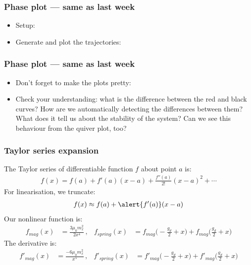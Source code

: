 \documentclass[9pt]{beamer-control}
\begin{document}
\begin{frame}
  \frametitle{Phase plot --- same as last week}

  \begin{itemize}
    \item Setup:
  \end{itemize}

  \begin{itemize}
    \item Generate and plot the trajectories:
  \end{itemize}

\end{frame}

\begin{frame}
  \frametitle{Phase plot --- same as last week}

  \begin{itemize}
    \item Don't forget to make the plots pretty:
  \end{itemize}


  \begin{itemize}
    \item Check your understanding: what is the difference between the red and black curves? How are we automatically detecting the differences between them? What does it tell us about the stability of the system? Can we see this behaviour from the quiver plot, too?
  \end{itemize}

\end{frame}



\begin{frame}
  \frametitle{Taylor series expansion}
  The Taylor series of differentiable function $f$ about point $a$ is:
  \begin{align}
    f(x) = f(a) + f'(a)(x - a) + \frac{f''(a)}{2!}(x - a)^2 + \cdots
  \end{align}
  For linearisation, we truncate:
  \begin{align}
    f(x) \approx f(a) + \alert{f'(a)}(x - a)
  \end{align}
  Our nonlinear function is:
  \begin{align}
    f_{mag}(x)  &= \frac{3 \mu_0 m_x^2}{2 x^4} \,, & f_{spring}(x)  &= f_{mag}\bigl(-\tfrac{g_d}{2}+x\bigr) + f_{mag}\bigl(\tfrac{g_d}{2}+x\bigr)
  \end{align}
  The derivative is:
  \begin{align}
    f'_{mag}(x)  &= \frac{-6 \mu_0 m_x^2}{x^5} \,, & f'_{spring}(x) &= f'_{mag}\bigl(-\tfrac{g_d}{2}+x\bigr) + f'_{mag}\bigl(\tfrac{g_d}{2}+x\bigr)
  \end{align}
\end{frame}
\end{document}
